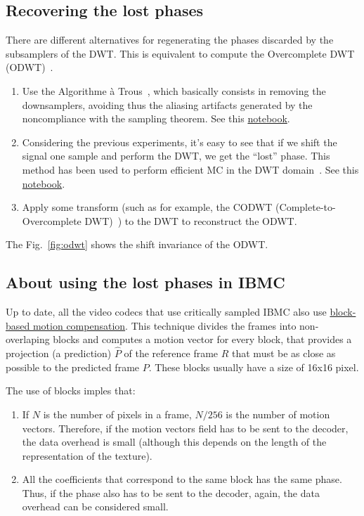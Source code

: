 \subsection{Recovering the lost phases}
There are different alternatives for regenerating the phases discarded
by the subsamplers of the DWT. This is equivalent to compute the
Overcomplete DWT (ODWT)~\cite{mallat1999wavelet}.
\begin{enumerate}
\item Use the Algorithme \`a Trous~\cite{mallat1999wavelet}, which
  basically consists in removing the downsamplers, avoiding thus the
  aliasing artifacts generated by the noncompliance with the sampling
  theorem. See this
  \href{https://github.com/Sistemas-Multimedia/Sistemas-Multimedia.github.io/blob/master/study_guide/11-MC_in_DWT_domain/regenerating.ipynb}{notebook}.
\item Considering the previous experiments, it's easy to see that if
  we shift the signal one sample and perform the DWT, we get the
  ``lost'' phase. This method has been used to perform efficient MC in
  the DWT domain~\cite{park2000motion,li2001all}. See this \href{https://github.com/Sistemas-Multimedia/Sistemas-Multimedia.github.io/blob/master/study_guide/11-MC_in_DWT_domain/ODWT_with_delay.ipynb}{notebook}.
\item Apply some transform (such as for example, the CODWT
  (Complete-to-Overcomplete DWT)~\cite{andreopoulos2005complete}) to
  the DWT to reconstruct the ODWT.
\end{enumerate}
The Fig.~\ref{fig:odwt} shows the shift invariance of the ODWT.

\subsection{About using the lost phases in IBMC}
Up to date, all the video codecs that use critically sampled IBMC also
use
\href{https://vicente-gonzalez-ruiz.github.io/video_compression/}{block-based
  motion compensation}. This technique divides the frames into
non-overlaping blocks and computes a motion vector for every block,
that provides a projection (a prediction) $\hat{P}$ of the reference
frame $R$ that must be as close as possible to the predicted frame
$P$. These blocks usually have a size of 16x16 pixel.

The use of blocks imples that:
\begin{enumerate}
\item If $N$ is the number of pixels in a frame, $N/256$ is the number
  of motion vectors. Therefore, if the motion vectors field has to be
  sent to the decoder, the data overhead is small (although this
  depends on the length of the representation of the texture).
\item All the coefficients that correspond to the same block has the
  same phase. Thus, if the phase also has to be sent to the decoder,
  again, the data overhead can be considered small.
\end{enumerate}


